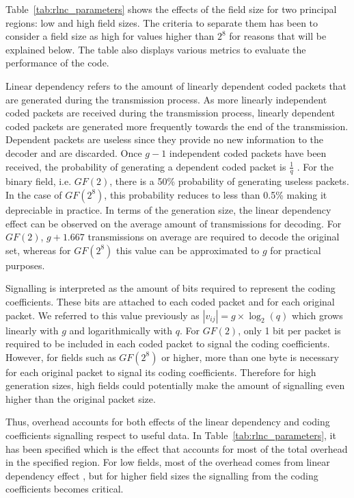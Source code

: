Table~\ref{tab:rlnc_parameters} shows the effects of the field size for two principal regions: low and high field sizes. The criteria to separate them has been to consider a field size as high for values higher than $2^8$ for reasons that will be explained below. The table also displays various metrics to evaluate the performance of the code.

Linear dependency refers to the amount of linearly dependent coded packets that are generated during the transmission process. As more linearly independent coded packets are received during the transmission process, linearly dependent coded packets are generated more frequently towards the end of the transmission. Dependent packets are useless since they provide no new information to the decoder and are discarded. Once $g - 1$ independent coded packets have been received, the probability of generating a dependent coded packet is $\frac{1}{q}$ \cite{lucani2009random,heide2011code}. For the binary field, i.e. $GF(2)$, there is a 50\% probability of generating useless packets. In the case of $GF(2^8)$, this probability reduces to less than 0.5\% making it depreciable in practice. In terms of the generation size, the linear dependency effect can be observed on the average amount of transmissions for decoding. For $GF(2)$, $g + 1.667$ transmissions on average are required to decode the original set, whereas for $GF(2^8)$ this value can be approximated to $g$ for practical purposes. 

Signalling is interpreted as the amount of bits required to represent the coding coefficients. These bits are attached to each coded packet and for each original packet. We referred to this value previously as $|v_{ij}| = g \times \log_{2}(q)$ which grows linearly with $g$ and logarithmically with $q$. For $GF(2)$, only 1 bit per packet is required to be included in each coded packet to signal the coding coefficients. However, for fields such as $GF(2^8)$ or higher, more than one byte is necessary for each original packet to signal its coding coefficients. Therefore for high generation sizes, high fields could potentially make the amount of signalling even higher than the original packet size.

Thus, overhead accounts for both effects of the linear dependency and coding coefficients signalling respect to useful data. In Table~\ref{tab:rlnc_parameters}, it has been specified which is the effect that accounts for most of the total overhead in the specified region. For low fields, most of the overhead comes from linear dependency effect , but for higher field sizes the signalling from the coding coefficients becomes critical. 

